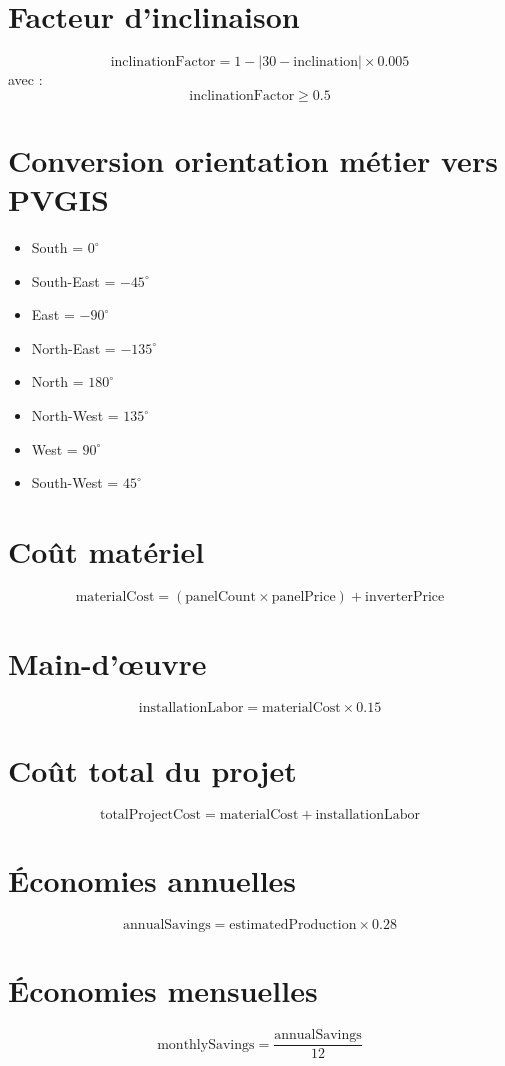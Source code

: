 \documentclass[12pt,a4paper]{article}
\begin{document}
\section{Facteur d'inclinaison}
\[
\text{inclinationFactor} = 1 - \left|30 - \text{inclination}\right| \times 0.005
\]
avec :
\[
\text{inclinationFactor} \ge 0.5
\]

\section{Conversion orientation métier vers PVGIS}
\begin{itemize}[leftmargin=1.5cm]
    \item South = $0^\circ$
    \item South-East = $-45^\circ$
    \item East = $-90^\circ$
    \item North-East = $-135^\circ$
    \item North = $180^\circ$
    \item North-West = $135^\circ$
    \item West = $90^\circ$
    \item South-West = $45^\circ$
\end{itemize}

\section{Coût matériel}
\[
\text{materialCost} = (\text{panelCount} \times \text{panelPrice}) + \text{inverterPrice}
\]

\section{Main-d'œuvre}
\[
\text{installationLabor} = \text{materialCost} \times 0.15
\]

\section{Coût total du projet}
\[
\text{totalProjectCost} = \text{materialCost} + \text{installationLabor}
\]

\section{Économies annuelles}
\[
\text{annualSavings} = \text{estimatedProduction} \times 0.28
\]

\section{Économies mensuelles}
\[
\text{monthlySavings} = \frac{\text{annualSavings}}{12}
\]
\end{document}
